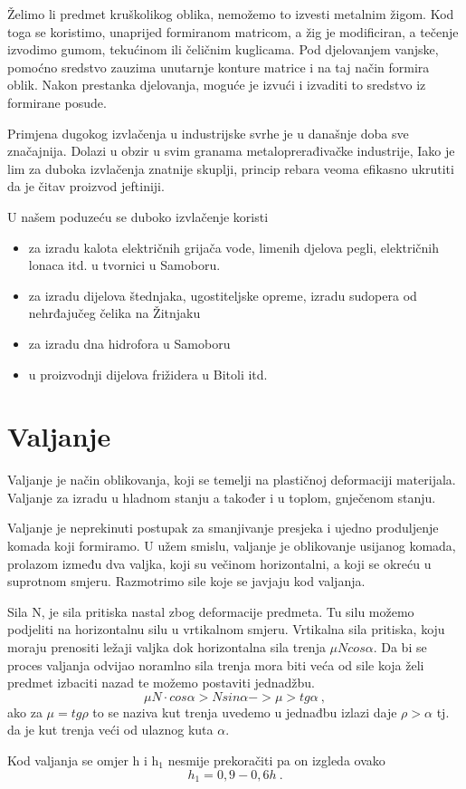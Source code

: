 \documentclass[a4paper,12pt]{article}
\numberwithin{figure}{section}
\begin{document}
Želimo li predmet kruškolikog oblika, nemožemo to izvesti metalnim žigom. Kod toga se koristimo, unaprijed formiranom matricom, a žig je modificiran, a tečenje izvodimo gumom, tekućinom ili čeličnim kuglicama. Pod djelovanjem vanjske, pomoćno sredstvo zauzima unutarnje konture matrice i na taj način formira oblik. Nakon prestanka djelovanja, moguće je izvući i izvaditi to sredstvo iz formirane posude. \par
Primjena dugokog izvlačenja u industrijske svrhe je u današnje doba sve značajnija. Dolazi u obzir u svim granama metaloprerađivačke industrije, Iako je lim za duboka izvlačenja znatnije skuplji, princip rebara veoma efikasno ukrutiti da je čitav proizvod jeftiniji.\par
U našem poduzeću se duboko izvlačenje koristi 
\begin{itemize}
\item za izradu kalota električnih grijača vode, limenih djelova pegli, električnih lonaca itd. u tvornici u Samoboru.
\item za izradu dijelova štednjaka, ugostiteljske opreme, izradu sudopera od nehrđajučeg čelika na Žitnjaku
\item za izradu dna hidrofora u Samoboru
\item u proizvodnji dijelova frižidera u Bitoli itd.
\end{itemize}
\section{Valjanje}
Valjanje je način oblikovanja, koji se temelji na plastičnoj deformaciji materijala. Valjanje za izradu u hladnom stanju a također i  u toplom, gnječenom stanju.\par
Valjanje je neprekinuti postupak za smanjivanje presjeka i ujedno produljenje komada koji formiramo. U užem smislu, valjanje je oblikovanje usijanog komada, prolazom između dva valjka, koji su večinom horizontalni, a koji se okreću u suprotnom smjeru. Razmotrimo sile koje se javjaju kod valjanja.\par
Sila N, je sila pritiska nastal zbog deformacije predmeta. Tu silu možemo podjeliti na horizontalnu silu u vrtikalnom smjeru. Vrtikalna sila pritiska, koju moraju prenositi ležaji valjka dok horizontalna sila trenja $\mu N cos \alpha$. Da bi se proces valjanja odvijao noramlno sila trenja mora biti veća od sile koja želi predmet izbaciti nazad te možemo postaviti jednadžbu.
\begin{equation}
\mu N\cdot cos \alpha > N sin \alpha -> \mu > tg \alpha\:,
\end{equation} 
ako za $\mu = tg\rho$ to se naziva kut trenja uvedemo u jednađbu izlazi daje $\rho>\alpha$ tj. da je kut trenja veći od ulaznog kuta $\alpha$.\par
Kod valjanja se omjer h i h$_{1}$ nesmije prekoračiti pa on izgleda ovako
\begin{equation}
h_{1}=0,9 - 0,6 h\:.
\end{equation}
\end{document}
